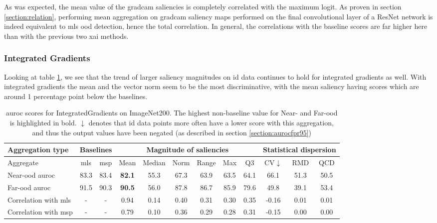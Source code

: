 \documentclass[UKenglish]{uiomasterthesis} %
\theoremstyle{definition}
\begin{document}
As was expected, the mean value of the \ac{gradcam} saliencies is completely correlated with the maximum logit. As proven in section \ref{section:relation}, performing mean aggregation on \ac{gradcam} saliency maps performed on the final convolutional layer of a ResNet network is indeed equivalent to \ac{mls} \ac{ood} detection, hence the total correlation. In general, the correlations with the baseline scores are far higher here than with the previous two \ac{xai} methods.

\subsubsection{Integrated Gradients}

Looking at table \ref{table:imagenet200_integratedgradients_metrics}, we see that the trend of larger saliency magnitudes on \ac{id} data continues to hold for integrated gradients as well. With integrated gradients the mean and the vector norm seem to be the most discriminative, with the mean saliency having scores which are around 1 percentage point below the baselines.

\begin{table}[H]
\setlength\tabcolsep{3pt}
\begin{center}
\begin{tabular}{ |p{5.1em}|c c|c c c c c c|c c c| }
    \hline
     \centering Aggregation type & \multicolumn{2}{c|}{Baselines} & \multicolumn{6}{c|}{Magnitude of saliencies} & \multicolumn{3}{p{8em}|}{\centering Statistical dispersion} \\
    \hline
    Aggregate & \ac{mls} & \ac{msp} & Mean & Median & Norm & Range & Max & Q3 & CV$\downarrow$ & RMD & QCD  \\
    \hline
    \rowcolor{near!50}
    Near-\ac{ood} \ac{auroc} & 83.3 & 83.4 &\textbf{ 82.1 }& 55.3 & 67.3 & 63.9 & 63.5 & 64.1 & 66.1 & 51.3 & 50.5  \\
    \hline
    \rowcolor{far!50}
    Far-\ac{ood} \ac{auroc} & 91.5 & 90.3 &\textbf{ 90.5 }& 56.0 & 87.8 & 86.7 & 85.9 & 79.6 & 49.8 & 39.1 & 53.4  \\
    \hline
    Correlation with \ac{mls}& - & - & 0.94 & 0.14 & 0.40 & 0.31 & 0.30 & 0.35 & -0.16 & 0.01 & 0.01  \\
    \hline
    Correlation with \ac{msp}& - & - & 0.79 & 0.10 & 0.36 & 0.29 & 0.28 & 0.31 & -0.15 & 0.00 & 0.00  \\
    \hline
    \end{tabular}
    \caption[\ac{auroc} scores for IntegratedGradients on ImageNet200]{\ac{auroc} scores for IntegratedGradients on ImageNet200. The highest non-baseline value for Near- and Far-\ac{ood} is highlighted in bold. $\downarrow$ denotes that \ac{id} data points more often have a lower score with this aggregation, and thus the output values have been negated (as described in section \ref{section:aurocfpr95})}
    \label{table:imagenet200_integratedgradients_metrics}
\end{center}
\setlength\tabcolsep{6pt}
\end{table}
\end{document}
